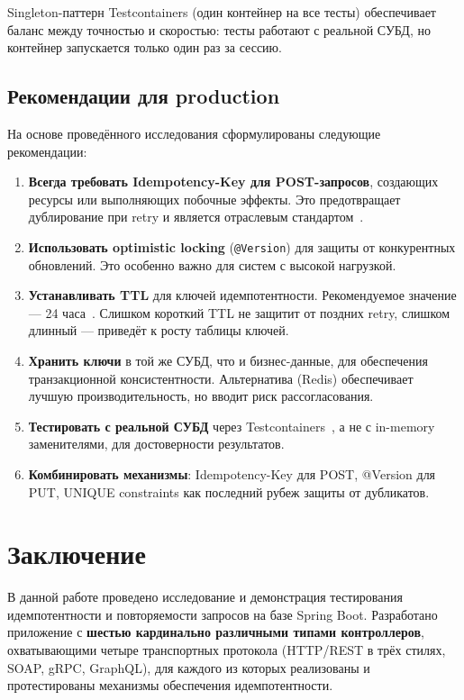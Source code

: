 Singleton-паттерн Testcontainers (один контейнер на все тесты) обеспечивает баланс между точностью и скоростью: тесты работают с реальной СУБД, но контейнер запускается только один раз за сессию.

\subsection{Рекомендации для production}

На основе проведённого исследования сформулированы следующие рекомендации:

\begin{enumerate}
    \item \textbf{Всегда требовать Idempotency-Key для POST-запросов}, создающих ресурсы или выполняющих побочные эффекты. Это предотвращает дублирование при retry и является отраслевым стандартом~\cite{stripe-idempotency}.
    \item \textbf{Использовать optimistic locking} (\texttt{@Version}) для защиты от конкурентных обновлений. Это особенно важно для систем с высокой нагрузкой.
    \item \textbf{Устанавливать TTL} для ключей идемпотентности. Рекомендуемое значение --- 24 часа~\cite{ietf-idempotency-key}. Слишком короткий TTL не защитит от поздних retry, слишком длинный --- приведёт к росту таблицы ключей.
    \item \textbf{Хранить ключи} в той же СУБД, что и бизнес-данные, для обеспечения транзакционной консистентности. Альтернатива (Redis) обеспечивает лучшую производительность, но вводит риск рассогласования.
    \item \textbf{Тестировать с реальной СУБД} через Testcontainers~\cite{testcontainers}, а не с in-memory заменителями, для достоверности результатов.
    \item \textbf{Комбинировать механизмы}: Idempotency-Key для POST, @Version для PUT, UNIQUE constraints как последний рубеж защиты от дубликатов.
\end{enumerate}

\section{Заключение}

В данной работе проведено исследование и демонстрация тестирования идемпотентности и повторяемости запросов на базе Spring Boot. Разработано приложение с \textbf{шестью кардинально различными типами контроллеров}, охватывающими четыре транспортных протокола (HTTP/REST в трёх стилях, SOAP, gRPC, GraphQL), для каждого из которых реализованы и протестированы механизмы обеспечения идемпотентности.

